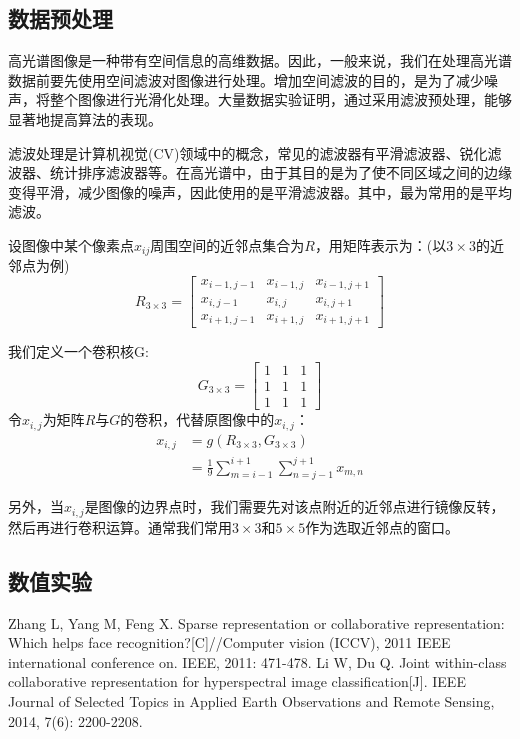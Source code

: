 \documentclass[12pt,a4paper]{article}
\begin{document}
\subsection{数据预处理}
高光谱图像是一种带有空间信息的高维数据。因此，一般来说，我们在处理高光谱数据前要先使用空间滤波对图像进行处理。增加空间滤波的目的，是为了减少噪声，将整个图像进行光滑化处理。大量数据实验证明，通过采用滤波预处理，能够显著地提高算法的表现。

滤波处理是计算机视觉(CV)领域中的概念，常见的滤波器有平滑滤波器、锐化滤波器、统计排序滤波器等。在高光谱中，由于其目的是为了使不同区域之间的边缘变得平滑，减少图像的噪声，因此使用的是平滑滤波器。其中，最为常用的是平均滤波。

设图像中某个像素点$x_{ij}$周围空间的近邻点集合为$R$，用矩阵表示为：(以$3 \times 3$的近邻点为例)
\begin{equation}
R_{3\times 3} = 
\left[\begin{array}{ccc}
x_{i - 1, j - 1} & x_{i - 1, j} & x_{i - 1, j + 1} \\
x_{i, j - 1} & x_{i, j} & x_{i, j + 1} \\
x_{i + 1, j - 1} & x_{i + 1, j} & x_{i + 1, j + 1}
\end{array}\right]
\end{equation}

我们定义一个卷积核G:
\begin{equation}
G_{3\times 3} = 
\left[\begin{array}{ccc}
1 & 1 & 1 \\
1 & 1 & 1 \\
1 & 1 & 1
\end{array}\right]
\end{equation}
令$x_{i, j}$为矩阵$R$与$G$的卷积，代替原图像中的$x_{i, j}$：
\begin{align*}
x_{i, j} & = g(R_{3 \times 3}, G_{3 \times 3}) \\	
		 & = \frac{1}{9} \sum_{m = i - 1}^{i + 1}\sum_{n = j - 1}^{j + 1}x_{m, n} 
\end{align*}

另外，当$x_{i,j}$是图像的边界点时，我们需要先对该点附近的近邻点进行镜像反转，然后再进行卷积运算。通常我们常用$3 \times 3$和$5 \times 5$作为选取近邻点的窗口。

\subsection{数值实验}

\begin{thebibliography}{}
 Zhang L, Yang M, Feng X. Sparse representation or collaborative representation: Which helps face recognition?[C]//Computer vision (ICCV), 2011 IEEE international conference on. IEEE, 2011: 471-478.
Li W, Du Q. Joint within-class collaborative representation for hyperspectral image classification[J]. IEEE Journal of Selected Topics in Applied Earth Observations and Remote Sensing, 2014, 7(6): 2200-2208.
\end{thebibliography}
\clearpage
\end{document}
